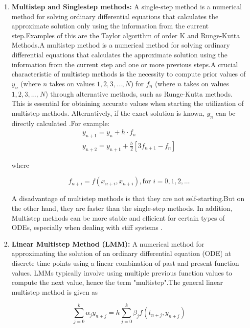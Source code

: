 \begin{enumerate}
  \item \textbf{Multistep and Singlestep methods:} A single-step method is a numerical method for solving ordinary differential equations that calculates the approximate solution only using the information from the current step.Examples of this are the Taylor algorithm of order K and Runge-Kutta Methods.A multistep method is a numerical method for solving ordinary differential equations that calculates the approximate solution using the information from the current step and one or more previous steps.A crucial characteristic of multistep methods is the necessity to compute prior values of \(y_n\) (where \(n\) takes on values \(1, 2, 3, \ldots, N\)) for \(f_n\) (where \(n\) takes on values \(1, 2, 3, \ldots, N\)) through alternative methods, such as Runge-Kutta methods. This is essential for obtaining accurate values when starting the utilization of multistep methods. Alternatively, if the exact solution is known, \(y_n\) can be directly calculated \cite{powerseriesJFatokun}.For example:
  \begin{eqnarray}
   y_{n+1} = y_n + h \cdot f_n \\
   y_{n+2} = y_{n+1} + \frac{h}{2} \left[ 3f_{n+1} - f_n \right]
  \end{eqnarray}

  where 
  
  \begin{equation}
    f_{n+i} = f(x_{n+i},x_{n+i}), \text{for } i = 0,1,2,\dots 
  \end{equation}
  

  A disadvantage of multistep methods is that they are not self-starting.But on the other hand, they are faster than the single-step methods. In addition, Multistep methods can be more stable and efficient for certain types of ODEs, especially when dealing with stiff systems \cite{powerseriesJFatokun}.

  \item \textbf{Linear Multistep Method (LMM):} A numerical method for approximating the solution of an ordinary differential equation (ODE) at discrete time points using a linear combination of past and present function values. LMMs typically involve using multiple previous function values to compute the next value, hence the term "multistep".The general linear multistep method is given as
  
  \begin{equation}\label{eq:linear_multistep}
    \sum_{j=0}^{k} \alpha_j y_{n+j} = h \sum_{j=0}^{k} \beta_j f(t_{n+j}, y_{n+j})
  \end{equation}
    

\end{enumerate}
